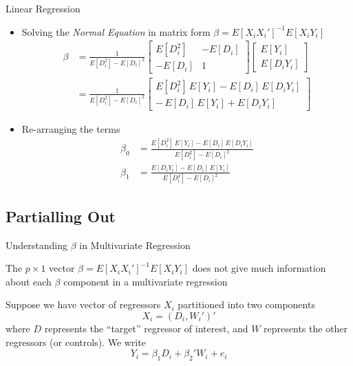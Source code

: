 \documentclass[aspectratio=1610,12pt,xcolor=dvipsnames]{beamer}
\begin{document}
\begin{frame}{Linear Regression}

\begin{itemize}
    \item Solving the \textit{Normal Equation} in matrix form $\beta = E[X_iX_i']^{-1}E[X_iY_i]$
    \begin{align*}
\beta
&= \frac{1}{E[D_i^2]-E[D_i]^2}
\begin{bmatrix}
E[D_i^2] & -E[D_i] \\
- E[D_i] & 1
\end{bmatrix}
\begin{bmatrix}
E[Y_i] \\ E[D_i Y_i]
\end{bmatrix} \\[4pt]
&= \frac{1}{E[D_i^2]-E[D_i]^2}
\begin{bmatrix}
E[D_i^2]\,E[Y_i] - E[D_i]\,E[D_iY_i] \\
-\,E[D_i]\,E[Y_i] + E[D_iY_i]
\end{bmatrix}
    \end{align*}
    \item Re-arranging the terms
    \begin{align*}
        \beta_0 &= \frac{E[D_i^2]\,E[Y_i] - E[D_i]\,E[D_iY_i]}{E[D_i^2]-E[D_i]^2} \\
\beta_1 &= \frac{E[D_iY_i] - E[D_i]\,E[Y_i]}{E[D_i^2]-E[D_i]^2}
    \end{align*}
\end{itemize}
\end{frame}

\subsection*{Partialling Out}

\begin{frame}
  \subsectionpage
\end{frame}

\begin{frame}{Understanding $\beta$ in Multivariate Regression}

The $p \times 1$ vector $\beta = E[X_iX_i']^{-1}E[X_iY_i]$ does not give much information about each $\beta$ component in a multivariate regression \pause

Suppose we have vector of regressors $X_i$ partitioned into two components
$$
X_i = (D_i,W_i')'
$$
where $D$ represents the ``target'' regressor of interest, and $W$ represents the other regressors (or controls). We write
$$
Y_i = \beta_1D_i + \beta_2'W_i + e_i
$$
\end{frame}
\end{document}
